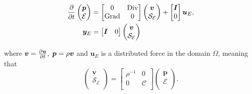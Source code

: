 \documentclass[11t]{article}
\DeclareMathOperator*{\Grad}{Grad}
\DeclareMathOperator*{\Div}{Div}
\begin{document}
\begin{equation}
\begin{aligned}
\diffp{}{t}
\begin{pmatrix}
\bm{p} \\
\mathcal{E} \\
\end{pmatrix} &= 
\begin{bmatrix}
0 & \Div \\
\Grad & 0 \\
\end{bmatrix}
\begin{pmatrix}
\bm{v} \\
\mathcal{S_E} \\
\end{pmatrix} + 
\begin{bmatrix}
\bm{I} \\
0 \\
\end{bmatrix}\bm{u}_E, \\
\bm{y}_E &= \begin{bmatrix}
\bm{I} & 0 \\
\end{bmatrix}\begin{pmatrix}
\bm{v} \\
\mathcal{S_E} \\
\end{pmatrix}
\end{aligned}
\end{equation} 

where $\bm{v}=\diffp{\bm{u}}{t}, \; \bm{p} = \rho \bm{v}$ and $\bm{u}_E$ is a distributed force  in the domain $\Omega$, meaning that 
\begin{equation}
\begin{pmatrix}
\bm{v} \\
\mathcal{S_E} \\
\end{pmatrix}= 
\begin{bmatrix}
\rho^{-1} & 0\\
0 & \mathcal{C} \\
\end{bmatrix}
\begin{pmatrix}
\bm{p} \\
\mathcal{E} \\
\end{pmatrix}.
\end{equation}
\end{document}

